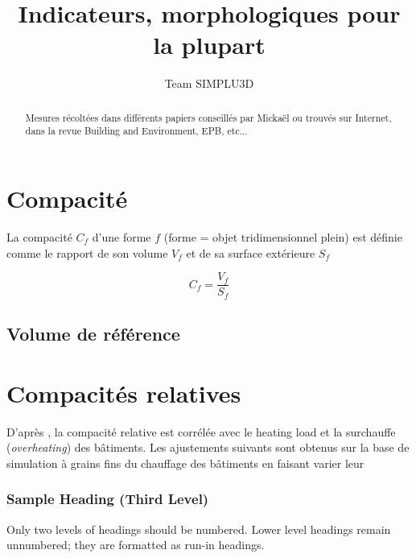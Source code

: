 \documentclass[[a4paper, 11pt]{article}
\begin{document}
%
\title{Indicateurs, morphologiques pour la plupart}
%
%
\author{Team SIMPLU3D}
%

%
\maketitle              %
%
\begin{abstract}
Mesures récoltées dans différents papiers conseillés par Mickaël ou trouvés sur Internet, dans la revue Building and Environment, EPB, etc...	  
\end{abstract}
%
%
%
\section{Compacité}

La compacité $C_f$ d'une forme $f$ (forme = objet tridimensionnel plein) est définie comme le rapport de son volume $V_f$  et de sa surface extérieure $S_f$

\begin{equation}
C_f= \frac{V_f}{S_f}
\end{equation}



\subsection{Volume de référence}



\section{Compacités relatives} %
\label{sec:compacités_relatives}



D'après \cite{pessenlehner_building_2003}, la compacité relative est corrélée avec le heating load et la surchauffe (\textit{overheating}) des bâtiments.
Les ajustements suivants sont obtenus sur la base de simulation à grains fins du chauffage des bâtiments en faisant varier leur  





\subsubsection{Sample Heading (Third Level)} Only two levels of
headings should be numbered. Lower level headings remain unnumbered;
they are formatted as run-in headings.
\end{document}
